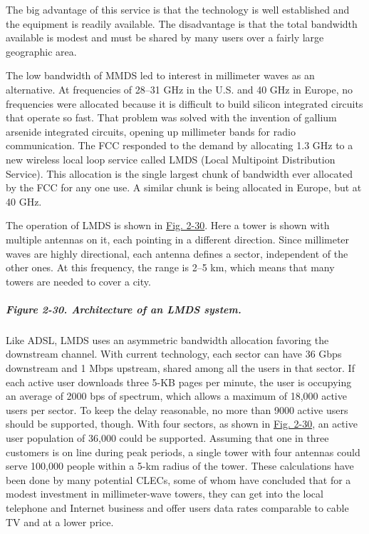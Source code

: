 \documentclass[b5paper,11pt]{memoir}
\begin{document}
The big advantage of this service is that the technology is well
established and the equipment is readily available. The disadvantage is
that the total bandwidth available is modest and must be shared by many
users over a fairly large geographic area.

The low bandwidth of MMDS led to interest in millimeter waves as an
alternative. At frequencies of 28--31 GHz in the U.S. and 40 GHz in
Europe, no frequencies were allocated because it is difficult to build
silicon integrated circuits that operate so fast. That problem was
solved with the invention of gallium arsenide integrated circuits,
opening up millimeter bands for radio communication. The FCC responded
to the demand by allocating 1.3 GHz to a new wireless local loop service
called {LMDS} ({Local Multipoint Distribution Service}). This allocation
is the single largest chunk of bandwidth ever allocated by the FCC for
any one use. A similar chunk is being allocated in Europe, but at 40
GHz.

The operation of LMDS is shown in
\protect\hyperlink{0130661023_ch02lev1sec5.htmlux5cux23ch02fig30}{Fig.
2-30}. Here a tower is shown with multiple antennas on it, each pointing
in a different direction. Since millimeter waves are highly directional,
each antenna defines a sector, independent of the other ones. At this
frequency, the range is 2--5 km, which means that many towers are needed
to cover a city.

\subparagraph[Figure 2-30. Architecture of an LMDS
system.]{\texorpdfstring{\protect\hypertarget{0130661023_ch02lev1sec5.htmlux5cux23ch02fig30}{}{}Figure
2-30. Architecture of an LMDS
system.}{Figure 2-30. Architecture of an LMDS system.}}


Like ADSL, LMDS uses an asymmetric bandwidth allocation favoring the
downstream channel. With current technology, each sector can have 36
Gbps downstream and 1 Mbps upstream, shared among all the users in that
sector. If each active user downloads three 5-KB pages per minute, the
user is occupying an average of 2000 bps of spectrum, which allows a
maximum of 18,000 active users per sector. To keep the delay reasonable,
no more than 9000 active users should be supported, though. With four
sectors, as shown in
\protect\hyperlink{0130661023_ch02lev1sec5.htmlux5cux23ch02fig30}{Fig.
2-30}, an active user population of 36,000 could be supported. Assuming
that one in three customers is on line during peak periods, a single
tower with four antennas could serve 100,000 people within a 5-km radius
of the tower. These calculations have been done by many potential CLECs,
some of whom have concluded that for a modest investment in
millimeter-wave towers, they can get into the local telephone and
Internet business and offer users data rates comparable to cable TV and
at a lower price.
\end{document}
